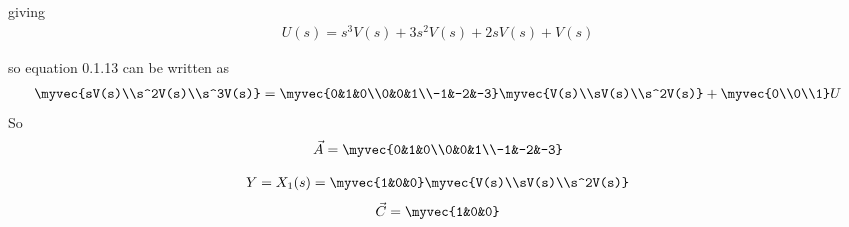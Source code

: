 \begin{enumerate}[label=\thesection.\arabic*.,ref=\thesection.\theenumi]
giving
\begin{align}
U(s)= s^3 V(s) + 3s^2 V(s)+2sV(s) + V(s)
\end{align}

so equation 0.1.13 can be written as
\begin{align}
\myvec{sV(s)\\s^2V(s)\\s^3V(s)}
=
\myvec{0&1&0\\0&0&1\\-1&-2&-3}\myvec{V(s)\\sV(s)\\s^2V(s)}
+
\myvec{0\\0\\1}  U
\end{align}
So 
\begin{align}
\vec{A}=\myvec{0&1&0\\0&0&1\\-1&-2&-3}
\end{align}

\begin{align}
Y=X_{1}(s)
=\myvec{1&0&0} \myvec{V(s)\\sV(s)\\s^2V(s)}
\end{align}
\begin{align}
\vec{C}=\myvec{1&0&0}
\end{align}


\end{enumerate}
